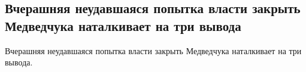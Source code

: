  
 
 
 
 
\subsection{Вчерашняя неудавшаяся попытка власти закрыть Медведчука наталкивает на три вывода}
\label{sec:14_05_2021.fb.krjukova_svetlana.1.medvedchuk}

Вчерашняя неудавшаяся попытка власти закрыть Медведчука наталкивает на три вывода.

